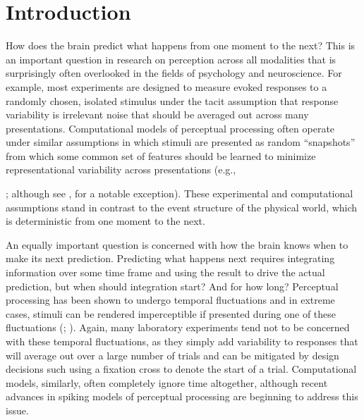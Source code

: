 \documentclass[defaultstyle,12pt]{article}
\begin{document}


\section{Introduction}
How does the brain predict what happens from one moment to the next? This is an important question in research on perception across all modalities that is surprisingly often overlooked in the fields of psychology and neuroscience. For example, most experiments are designed to measure evoked responses to a randomly chosen, isolated stimulus under the tacit assumption that response variability is irrelevant noise that should be averaged out across many presentations. Computational models of perceptual processing often operate under similar assumptions in which stimuli are presented as random ``snapshots'' from which some common set of features should be learned to minimize representational variability across presentations (e.g., {; although see , for a notable exception). These experimental and computational assumptions stand in contrast to the event structure of the physical world, which is deterministic from one moment to the next. 

An equally important question is concerned with how the brain knows when to make its next prediction. Predicting what happens next requires integrating information over some time frame and using the result to drive the actual prediction, but when should integration start? And for how long? Perceptual processing has been shown to undergo temporal fluctuations and in extreme cases, stimuli can be rendered imperceptible if presented during one of these fluctuations (; ). Again, many laboratory experiments tend not to be concerned with these temporal fluctuations, as they simply add variability to responses that will average out over a large number of trials and can be mitigated by design decisions such using a fixation cross to denote the start of a trial. Computational models, similarly, often completely ignore time altogether, although recent advances in spiking models of perceptual processing \cite[e.g.,]{MasquelierThorpe07} are beginning to address this issue.

}
\end{document}
